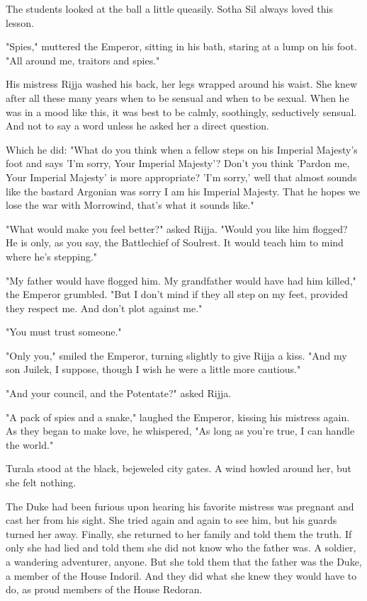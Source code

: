 The students looked at the ball a little queasily. Sotha Sil always loved this lesson.

"Spies," muttered the Emperor, sitting in his bath, staring at a lump on his foot. "All around me, traitors and spies."

His mistress Rijja washed his back, her legs wrapped around his waist. She knew after all these many years when to be sensual and when to be sexual. When he was in a mood like this, it was best to be calmly, soothingly, seductively sensual. And not to say a word unless he asked her a direct question.

Which he did: "What do you think when a fellow steps on his Imperial Majesty's foot and says 'I'm sorry, Your Imperial Majesty'? Don't you think 'Pardon me, Your Imperial Majesty' is more appropriate? 'I'm sorry,' well that almost sounds like the bastard Argonian was sorry I am his Imperial Majesty. That he hopes we lose the war with Morrowind, that's what it sounds like."

"What would make you feel better?" asked Rijja. "Would you like him flogged? He is only, as you say, the Battlechief of Soulrest. It would teach him to mind where he's stepping."

"My father would have flogged him. My grandfather would have had him killed," the Emperor grumbled. "But I don't mind if they all step on my feet, provided they respect me. And don't plot against me."

"You must trust someone."

"Only you," smiled the Emperor, turning slightly to give Rijja a kiss. "And my son Juilek, I suppose, though I wish he were a little more cautious."

"And your council, and the Potentate?" asked Rijja.

"A pack of spies and a snake," laughed the Emperor, kissing his mistress again. As they began to make love, he whispered, "As long as you're true, I can handle the world."

Turala stood at the black, bejeweled city gates. A wind howled around her, but she felt nothing.

The Duke had been furious upon hearing his favorite mistress was pregnant and cast her from his sight. She tried again and again to see him, but his guards turned her away. Finally, she returned to her family and told them the truth. If only she had lied and told them she did not know who the father was. A soldier, a wandering adventurer, anyone. But she told them that the father was the Duke, a member of the House Indoril. And they did what she knew they would have to do, as proud members of the House Redoran.

